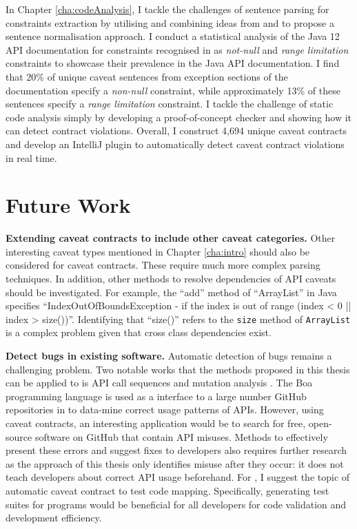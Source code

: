 In Chapter \ref{cha:codeAnalysis}, I tackle the challenges of sentence parsing for constraints extraction by utilising and combining ideas from \cite{zhou-directive} and \cite{blasi2018translating} to propose a sentence normalisation approach. I conduct a statistical analysis of the Java 12 API documentation for constraints recognised in \cite{zhou-directive} as \textit{not-null} and \textit{range limitation} constraints to showcase their prevalence in the Java API documentation. I find that 20\% of unique caveat sentences from exception sections of the documentation specify a \textit{non-null} constraint, while approximately 13\% of these sentences specify a \textit{range limitation} constraint. I tackle the challenge of static code analysis simply by developing a proof-of-concept checker and showing how it can detect contract violations. Overall, I construct 4,694 unique caveat contracts and develop an IntelliJ plugin to automatically detect caveat contract violations in real time. 

\section{Future Work}
\label{sec:future}

\noindent
\textbf{Extending caveat contracts to include other caveat categories.} Other interesting caveat types mentioned in Chapter \ref{cha:intro} should also be considered for caveat contracts. These require much more complex parsing techniques. In addition, other methods to resolve dependencies of API caveats should be investigated. For example, the ``add'' method of ``ArrayList'' in Java specifies ``IndexOutOfBoundsException - if the index is out of range (index < 0 || index > size())''. Identifying that ``size()'' refers to the \lstinline{size} method of \lstinline{ArrayList} is a complex problem given that cross class dependencies exist.

\noindent
\textbf{Detect bugs in existing software.} Automatic detection of bugs remains a challenging problem. Two notable works that the methods proposed in this thesis can be applied to is API call sequences \cite{code-examples} and mutation analysis \cite{mutation-analysis}. The Boa programming language is used as a interface to a large number GitHub repositories in \cite{code-examples} to data-mine correct usage patterns of APIs. However, using caveat contracts, an interesting application would be to search for free, open-source software on GitHub that contain API misuses. Methods to effectively present these errors and suggest fixes to developers also requires further research as the approach of this thesis only identifies misuse after they occur: it does not teach developers about correct API usage beforehand. For \cite{mutation-analysis}, I suggest the topic of automatic caveat contract to test code mapping. Specifically, generating test suites for programs would be beneficial for all developers for code validation and development efficiency.

